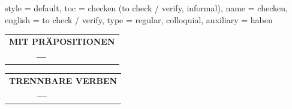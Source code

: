 \begin{verbentry}{
  style = {default},
  toc = {checken (to check / verify, informal)},
  name = {checken},
  english = {to check / verify},
  type = {regular, colloquial},
  auxiliary = {haben}
}
\vspace{10pt}

\begin{tabular}{lll}
\multicolumn{3}{l}{\textbf{MIT PRÄPOSITIONEN}}\\
& \textbf{---} & \\
\end{tabular}
\hfill
\begin{tabular}{lll}
\multicolumn{3}{l}{\textbf{TRENNBARE VERBEN}}\\
& \textbf{---} & \\
\end{tabular}
\vspace{-5pt}
\end{verbentry}
